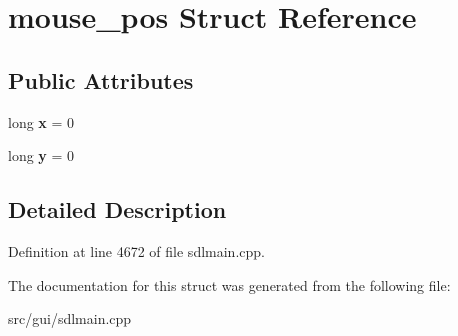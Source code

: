 \hypertarget{structmouse__pos}{\section{mouse\-\_\-pos Struct Reference}
\label{structmouse__pos}
}
\subsection*{Public Attributes}
\begin{DoxyCompactItemize}
\item 
\hypertarget{structmouse__pos_a87e6dd58ae6e8c7d1aabb6892b9d6f01}{long {\bfseries x} = 0}\label{structmouse__pos_a87e6dd58ae6e8c7d1aabb6892b9d6f01}

\item 
\hypertarget{structmouse__pos_a5c8305dffdd8ece94010679489de824d}{long {\bfseries y} = 0}\label{structmouse__pos_a5c8305dffdd8ece94010679489de824d}

\end{DoxyCompactItemize}


\subsection{Detailed Description}


Definition at line 4672 of file sdlmain.\-cpp.



The documentation for this struct was generated from the following file\-:\begin{DoxyCompactItemize}
\item 
src/gui/sdlmain.\-cpp\end{DoxyCompactItemize}
